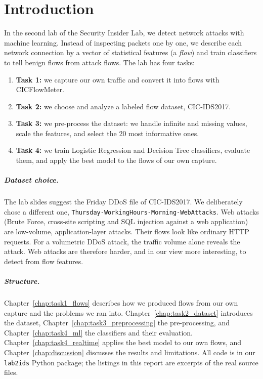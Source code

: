 \chapter{Introduction}\label{chap:introduction}

In the second lab of the Security Insider Lab, we detect network attacks with machine learning. Instead of inspecting packets one by one, we describe each network connection by a vector of statistical features (a \emph{flow}) and train classifiers to tell benign flows from attack flows. The lab has four tasks:

\begin{enumerate}\setlength\itemsep{0pt}
	\item \textbf{Task 1:} we capture our own traffic and convert it into flows with CICFlowMeter.
	\item \textbf{Task 2:} we choose and analyze a labeled flow dataset, CIC-IDS2017.
	\item \textbf{Task 3:} we pre-process the dataset: we handle infinite and missing values, scale the features, and select the 20 most informative ones.
	\item \textbf{Task 4:} we train Logistic Regression and Decision Tree classifiers, evaluate them, and apply the best model to the flows of our own capture.
\end{enumerate}

\paragraph{Dataset choice.} The lab slides suggest the Friday DDoS file of CIC-IDS2017. We deliberately chose a different one, \texttt{Thursday-WorkingHours-Morning-WebAttacks}. Web attacks (Brute Force, cross-site scripting and SQL injection against a web application) are low-volume, application-layer attacks. Their flows look like ordinary HTTP requests. For a volumetric DDoS attack, the traffic volume alone reveals the attack. Web attacks are therefore harder, and in our view more interesting, to detect from flow features.

\paragraph{Structure.} Chapter~\ref{chap:task1_flows} describes how we produced flows from our own capture and the problems we ran into. Chapter~\ref{chap:task2_dataset} introduces the dataset, Chapter~\ref{chap:task3_preprocessing} the pre-processing, and Chapter~\ref{chap:task4_ml} the classifiers and their evaluation. Chapter~\ref{chap:task4_realtime} applies the best model to our own flows, and Chapter~\ref{chap:discussion} discusses the results and limitations. All code is in our \texttt{lab2ids} Python package; the listings in this report are excerpts of the real source files.

